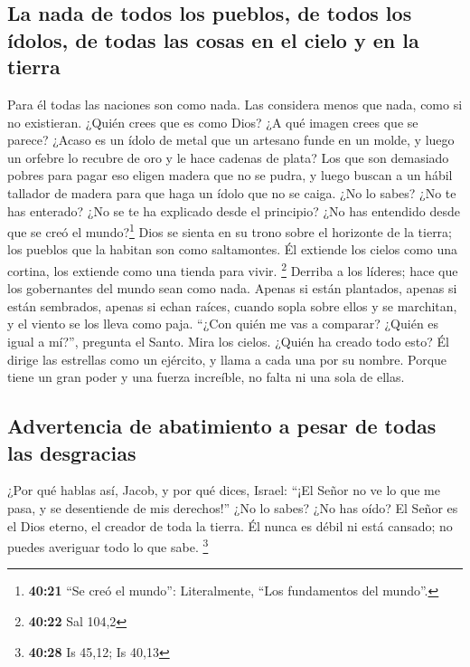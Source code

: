 \hypertarget{la-nada-de-todos-los-pueblos-de-todos-los-uxeddolos-de-todas-las-cosas-en-el-cielo-y-en-la-tierra}{%
\subsection{La nada de todos los pueblos, de todos los ídolos, de todas
las cosas en el cielo y en la
tierra}\label{la-nada-de-todos-los-pueblos-de-todos-los-uxeddolos-de-todas-las-cosas-en-el-cielo-y-en-la-tierra}}

 Para él todas las naciones son como nada. Las considera
menos que nada, como si no existieran.  ¿Quién crees que
es como Dios? ¿A qué imagen crees que se parece?  ¿Acaso
es un ídolo de metal que un artesano funde en un molde, y luego un
orfebre lo recubre de oro y le hace cadenas de plata? 
Los que son demasiado pobres para pagar eso eligen madera que no se
pudra, y luego buscan a un hábil tallador de madera para que haga un
ídolo que no se caiga.  ¿No lo sabes? ¿No te has
enterado? ¿No se te ha explicado desde el principio? ¿No has entendido
desde que se creó el mundo?\footnote{\textbf{40:21} ``Se creó el
  mundo'': Literalmente, ``Los fundamentos del mundo''.} 
Dios se sienta en su trono sobre el horizonte de la tierra; los pueblos
que la habitan son como saltamontes. Él extiende los cielos como una
cortina, los extiende como una tienda para vivir. \footnote{\textbf{40:22}
  Sal 104,2}  Derriba a los líderes; hace que los
gobernantes del mundo sean como nada.  Apenas si están
plantados, apenas si están sembrados, apenas si echan raíces, cuando
sopla sobre ellos y se marchitan, y el viento se los lleva como paja.
 ``¿Con quién me vas a comparar? ¿Quién es igual a mí?'',
pregunta el Santo.  Mira los cielos. ¿Quién ha creado
todo esto? Él dirige las estrellas como un ejército, y llama a cada una
por su nombre. Porque tiene un gran poder y una fuerza increíble, no
falta ni una sola de ellas.

\hypertarget{advertencia-de-abatimiento-a-pesar-de-todas-las-desgracias}{%
\subsection{Advertencia de abatimiento a pesar de todas las
desgracias}\label{advertencia-de-abatimiento-a-pesar-de-todas-las-desgracias}}

 ¿Por qué hablas así, Jacob, y por qué dices, Israel:
``¡El Señor no ve lo que me pasa, y se desentiende de mis derechos!''
 ¿No lo sabes? ¿No has oído? El Señor es el Dios eterno,
el creador de toda la tierra. Él nunca es débil ni está cansado; no
puedes averiguar todo lo que sabe. \footnote{\textbf{40:28} Is 45,12; Is
  40,13}

